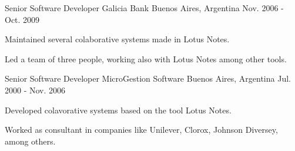 \begin{cventries}
    \cventry
    {Senior Software Developer} %
    {Galicia Bank} %
    {Buenos Aires, Argentina} %
    {Nov. 2006 - Oct. 2009} %
    {
    \begin{cvitems} %
        \item {Maintained several colaborative systems made in Lotus Notes.}
        \item {Led a team of three people, working also with Lotus Notes among other tools.}
    \end{cvitems}
    }

    \cventry
    {Senior Software Developer} %
    {MicroGestion Software} %
    {Buenos Aires, Argentina} %
    {Jul. 2000 - Nov. 2006} %
    {
    \begin{cvitems} %
        \item {Developed colavorative systems based on the tool Lotus Notes.}
        \item {Worked as consultant in companies like Unilever, Clorox, Johnson Diversey, among others.}
    \end{cvitems}
    }

\end{cventries}
